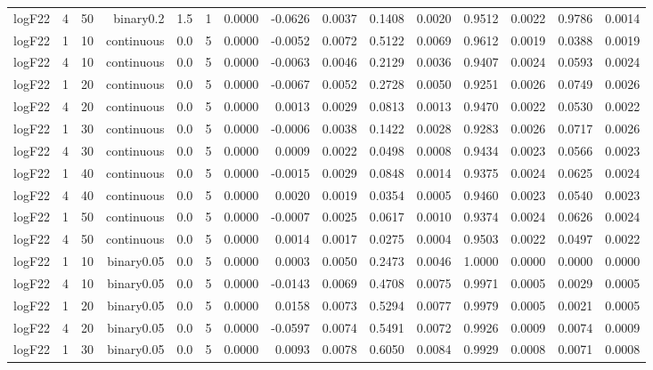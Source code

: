 \begin{longtable}{rrrrrrrrrrrrrrr}
  logF22 & 4 & 50 & binary0.2 & 1.5 & 1 & 0.0000 & -0.0626 & 0.0037 & 0.1408 & 0.0020 & 0.9512 & 0.0022 & 0.9786 & 0.0014 \\ 
  logF22 & 1 & 10 & continuous & 0.0 & 5 & 0.0000 & -0.0052 & 0.0072 & 0.5122 & 0.0069 & 0.9612 & 0.0019 & 0.0388 & 0.0019 \\ 
  logF22 & 4 & 10 & continuous & 0.0 & 5 & 0.0000 & -0.0063 & 0.0046 & 0.2129 & 0.0036 & 0.9407 & 0.0024 & 0.0593 & 0.0024 \\ 
  logF22 & 1 & 20 & continuous & 0.0 & 5 & 0.0000 & -0.0067 & 0.0052 & 0.2728 & 0.0050 & 0.9251 & 0.0026 & 0.0749 & 0.0026 \\ 
  logF22 & 4 & 20 & continuous & 0.0 & 5 & 0.0000 & 0.0013 & 0.0029 & 0.0813 & 0.0013 & 0.9470 & 0.0022 & 0.0530 & 0.0022 \\ 
  logF22 & 1 & 30 & continuous & 0.0 & 5 & 0.0000 & -0.0006 & 0.0038 & 0.1422 & 0.0028 & 0.9283 & 0.0026 & 0.0717 & 0.0026 \\ 
  logF22 & 4 & 30 & continuous & 0.0 & 5 & 0.0000 & 0.0009 & 0.0022 & 0.0498 & 0.0008 & 0.9434 & 0.0023 & 0.0566 & 0.0023 \\ 
  logF22 & 1 & 40 & continuous & 0.0 & 5 & 0.0000 & -0.0015 & 0.0029 & 0.0848 & 0.0014 & 0.9375 & 0.0024 & 0.0625 & 0.0024 \\ 
  logF22 & 4 & 40 & continuous & 0.0 & 5 & 0.0000 & 0.0020 & 0.0019 & 0.0354 & 0.0005 & 0.9460 & 0.0023 & 0.0540 & 0.0023 \\ 
  logF22 & 1 & 50 & continuous & 0.0 & 5 & 0.0000 & -0.0007 & 0.0025 & 0.0617 & 0.0010 & 0.9374 & 0.0024 & 0.0626 & 0.0024 \\ 
  logF22 & 4 & 50 & continuous & 0.0 & 5 & 0.0000 & 0.0014 & 0.0017 & 0.0275 & 0.0004 & 0.9503 & 0.0022 & 0.0497 & 0.0022 \\ 
  logF22 & 1 & 10 & binary0.05 & 0.0 & 5 & 0.0000 & 0.0003 & 0.0050 & 0.2473 & 0.0046 & 1.0000 & 0.0000 & 0.0000 & 0.0000 \\ 
  logF22 & 4 & 10 & binary0.05 & 0.0 & 5 & 0.0000 & -0.0143 & 0.0069 & 0.4708 & 0.0075 & 0.9971 & 0.0005 & 0.0029 & 0.0005 \\ 
  logF22 & 1 & 20 & binary0.05 & 0.0 & 5 & 0.0000 & 0.0158 & 0.0073 & 0.5294 & 0.0077 & 0.9979 & 0.0005 & 0.0021 & 0.0005 \\ 
  logF22 & 4 & 20 & binary0.05 & 0.0 & 5 & 0.0000 & -0.0597 & 0.0074 & 0.5491 & 0.0072 & 0.9926 & 0.0009 & 0.0074 & 0.0009 \\ 
  logF22 & 1 & 30 & binary0.05 & 0.0 & 5 & 0.0000 & 0.0093 & 0.0078 & 0.6050 & 0.0084 & 0.9929 & 0.0008 & 0.0071 & 0.0008 \\ 

\end{longtable}
